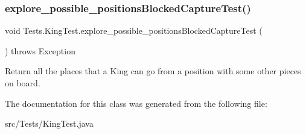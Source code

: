 \subsubsection{\texorpdfstring{explore\+\_\+possible\+\_\+positions\+Blocked\+Capture\+Test()}{explore\_possible\_positionsBlockedCaptureTest()}}
{\footnotesize\ttfamily void Tests.\+King\+Test.\+explore\+\_\+possible\+\_\+positions\+Blocked\+Capture\+Test (\begin{DoxyParamCaption}{ }\end{DoxyParamCaption}) throws Exception\hspace{0.3cm}{\ttfamily [inline]}}

Return all the places that a King can go from a position with some other pieces on board. 

The documentation for this class was generated from the following file\+:\begin{DoxyCompactItemize}
\item 
src/\+Tests/King\+Test.\+java\end{DoxyCompactItemize}
